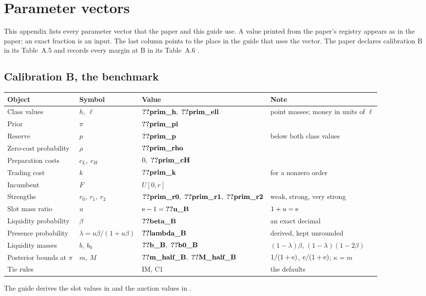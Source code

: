 \section{Parameter vectors}\label{sec:B_parameters}

This appendix lists every parameter vector that the paper and this guide use. A value printed from the paper's
registry appears as in the paper; an exact fraction is an input. The last column points to the place in the guide
that uses the vector. The paper declares calibration B in its Table~A.5 and records every margin at B in its
Table~A.6 .

\subsection{Calibration B, the benchmark}\label{sec:B_parameters-benchmark}

\begin{center}\small
\begin{tabularx}{\linewidth}{@{}lllX@{}}
\toprule
Object & Symbol & Value & Note\\
\midrule
Class values & \(h,\ \ell\) & \(\reg{prim_h},\ \reg{prim_ell}\) & point masses; money in units of \(\ell\)\\
Prior & \(\pi\) & \(\reg{prim_pi}\) & \\
Reserve & \(p\) & \(\reg{prim_p}\) & below both class values\\
Zero-cost probability & \(\rho\) & \(\reg{prim_rho}\) & \\
Preparation costs & \(c_L,\ c_H\) & \(0,\ \reg{prim_cH}\) & \\
Trading cost & \(k\) & \(\reg{prim_k}\) & for a nonzero order\\
Incumbent & \(F\) & \(U[0,r]\) & \\
Strengths & \(r_0,\ r_1,\ r_2\) & \(\reg{prim_r0},\ \reg{prim_r1},\ \reg{prim_r2}\) & weak, strong, very strong\\
Slot mass ratio & \(u\) & \(\eu-1=\reg{u_B}\) & \(1+u=\mathrm{e}\)\\
Liquidity probability & \(\beta\) & \(\reg{beta_B}\) & an exact decimal\\
Presence probability & \(\lambda=u\beta/(1+u\beta)\) & \(\reg{lambda_B}\) & derived, kept unrounded\\
Liquidity masses & \(b,\ b_0\) & \(\reg{b_B},\ \reg{b0_B}\) & \((1-\lambda)\beta\), \((1-\lambda)(1-2\beta)\)\\
Posterior bounds at \(\pi\) & \(m,\ M\) & \(\reg{m_half_B},\ \reg{M_half_B}\) & \(1/(1+\mathrm{e})\), \(\mathrm{e}/(1+\mathrm{e})\); \(\kappa=m\)\\
Tie rules & & IM, C1 & the defaults\\
\bottomrule
\end{tabularx}
\end{center}
The guide derives the slot values in  and the auction values in
.


